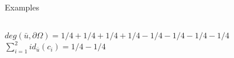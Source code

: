 \documentclass[compress,10pt,aspectratio=169]{beamer}
\begin{document}
\begin{frame}{Examples}
\begin{columns}
\begin{column}{0.34\textwidth}
{    $deg(\bar{u}, \partial\Omega) = 1/4+1/4+1/4+1/4-1/4-1/4-1/4-1/4$\\\vspace{0.1cm}
    $\sum_{i=1}^{2} id_{\bar{u}}(c_i)=1/4-1/4$\\\vspace{0.2cm}
    \scriptsize\color{onera_gray}{ Nautilus}}
\end{column}
\end{columns}
\end{frame}



\end{document}
